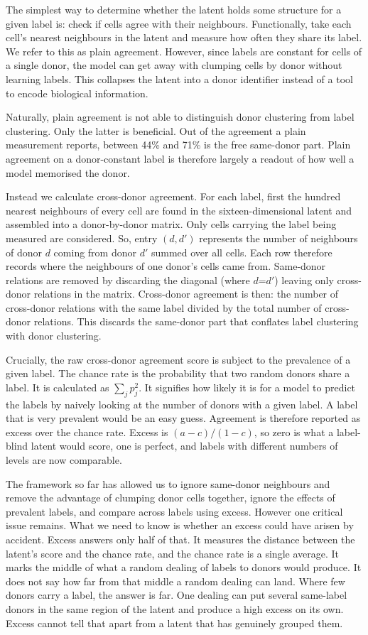 The simplest way to determine whether the latent holds some structure for a 
given label is: check if cells agree with their neighbours. Functionally, 
take each cell's nearest neighbours in the latent and measure how often they 
share its label. We refer to this as plain agreement. However, since labels 
are constant for cells of a single donor, the model can get away with clumping 
cells by donor without learning labels. This collapses the latent into a donor 
identifier instead of a tool to encode biological information.

Naturally, plain agreement is not able to distinguish donor clustering from 
label clustering. Only the latter is beneficial. Out of the agreement a plain 
measurement reports, between 44\% and 71\% is the free same-donor part. Plain 
agreement on a donor-constant label is therefore largely a readout of how 
well a model memorised the donor.

Instead we calculate cross-donor agreement. For each label, first 
the hundred nearest neighbours of every cell are found in the
sixteen-dimensional latent and assembled into a donor-by-donor matrix. Only
cells carrying the label being measured are considered. So, entry $(d, d')$ 
represents the number of neighbours of donor $d$ coming from donor $d'$ 
summed over all cells. Each row therefore records where the neighbours of one 
donor's cells came from. Same-donor relations are removed by discarding the 
diagonal (where $d$=$d'$) leaving only cross-donor relations in the matrix.
Cross-donor agreement is then: the number of cross-donor relations 
with the same label divided by the total number of cross-donor relations. 
This discards the same-donor part that conflates label clustering with 
donor clustering.

Crucially, the raw cross-donor agreement score is subject to the prevalence 
of a given label. The chance rate is the probability that two random donors 
share a label. It is calculated as $\sum_j p_j^2$. It signifies how likely it 
is for a model to predict the labels by naively looking at the number of 
donors with a given label. A label that is very prevalent would be an easy 
guess. Agreement is therefore reported as excess over the chance rate. Excess 
is $(a - c)/(1 - c)$, so zero is what a label-blind latent would score, one is
perfect, and labels with different numbers of levels are now comparable.

The framework so far has allowed us to ignore same-donor neighbours and 
remove the advantage of clumping donor cells together, ignore the effects 
of prevalent labels, and compare across labels using excess.
However one critical issue remains. What we need to know is whether an
excess could have arisen by accident. Excess answers only half of that. It
measures the distance between the latent's score and the chance rate, and
the chance rate is a single average. It marks the middle of what a random
dealing of labels to donors would produce. It does not say how far from
that middle a random dealing can land. Where few donors carry a label, the
answer is far. One dealing can put several same-label donors in the same
region of the latent and produce a high excess on its own. Excess cannot
tell that apart from a latent that has genuinely grouped them.


